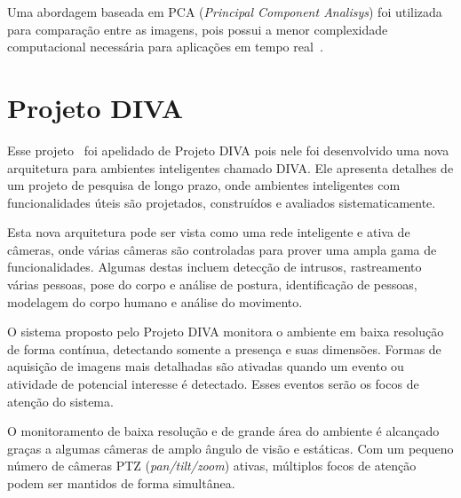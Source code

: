 Uma abordagem baseada em PCA (\textit{Principal Component Analisys}) foi utilizada para comparação entre as imagens, pois possui a menor complexidade computacional necessária para aplicações em tempo real~\cite{salah}.


\section{Projeto DIVA}

Esse projeto~\cite{trivedi} foi apelidado de Projeto DIVA pois nele foi desenvolvido uma nova arquitetura para ambientes inteligentes chamado DIVA. Ele apresenta detalhes de um projeto de pesquisa de longo prazo, onde ambientes inteligentes com funcionalidades úteis são projetados, construídos e avaliados sistematicamente. 

Esta nova arquitetura pode ser vista como uma rede inteligente e ativa de câmeras, onde várias câmeras são controladas para prover uma ampla gama de funcionalidades. Algumas destas incluem detecção de intrusos, rastreamento várias pessoas, pose do corpo e análise de postura, identificação de pessoas, modelagem do corpo humano e análise do movimento.

O sistema proposto pelo Projeto DIVA monitora o ambiente em baixa resolução de forma contínua, detectando somente a presença e suas dimensões. Formas de aquisição de imagens mais detalhadas são ativadas quando um evento ou atividade de potencial interesse é detectado. Esses eventos serão os focos de atenção do sistema.

O monitoramento de baixa resolução e de grande área do ambiente é alcançado graças a algumas câmeras de amplo ângulo de visão e estáticas. Com um pequeno número de câmeras PTZ (\textit{pan/tilt/zoom}) ativas, múltiplos focos de atenção podem ser mantidos de forma simultânea.

